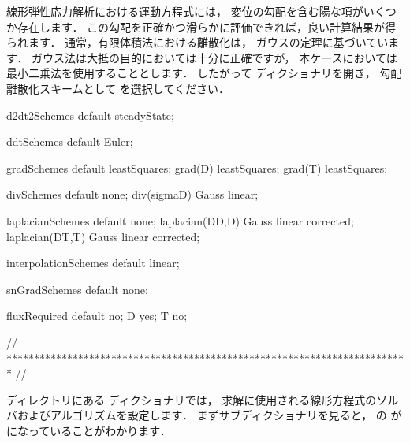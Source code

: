 線形弾性応力解析における運動方程式には，
変位の勾配を含む陽な項がいくつか存在します．
この勾配を正確かつ滑らかに評価できれば，良い計算結果が得られます．
通常，有限体積法における離散化は，
%
ガウスの定理に基づいています．
ガウス法は大抵の目的においては十分に正確ですが，
本ケースにおいては
%
%
最小二乗法を使用することとします．
したがって
%
%
ディクショナリを開き，
勾配離散化スキームとして
%
%
を選択してください．
\begin{OFverbatim}[file, linenum=17]

d2dt2Schemes
{
    default         steadyState;
}

ddtSchemes
{
    default         Euler;
}

gradSchemes
{
    default         leastSquares;
    grad(D)         leastSquares;
    grad(T)         leastSquares;
}

divSchemes
{
    default         none;
    div(sigmaD)     Gauss linear;
}

laplacianSchemes
{
    default         none;
    laplacian(DD,D) Gauss linear corrected;
    laplacian(DT,T) Gauss linear corrected;
}

interpolationSchemes
{
    default         linear;
}

snGradSchemes
{
    default         none;
}

fluxRequired
{
    default         no;
    D               yes;
    T               no;
}


// ************************************************************************* //
\end{OFverbatim}
ディレクトリにある
ディクショナリでは，
求解に使用される線形方程式のソルバおよびアルゴリズムを設定します．
まずサブディクショナリを見ると，
の
%
%
が
%
%
になっていることがわかります．
%
